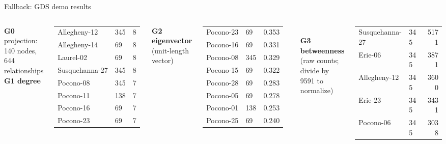 \documentclass[aspectratio=169, 10pt]{beamer}
\begin{document}
\begin{frame}[fragile]{Fallback: GDS demo results}
  \vspace{0.1cm}
  \scriptsize
  \begin{columns}[T]
      \textbf{G0} projection: 140 nodes, 644 relationships\\[6pt]
      \textbf{G1 degree}\\[2pt]
      \begin{tabular}{@{}llr@{}}\toprule
        Allegheny-12 & 345 & 8\\ Allegheny-14 & 69 & 8\\ Laurel-02 & 69 & 8\\ Susquehanna-27 & 345 & 8\\ Pocono-08 & 345 & 7\\ Pocono-11 & 138 & 7\\ Pocono-16 & 69 & 7\\ Pocono-23 & 69 & 7\\ \bottomrule
      \end{tabular}
      \textbf{G2 eigenvector} (unit-length vector)\\[2pt]
      \begin{tabular}{@{}llr@{}}\toprule
        Pocono-23 & 69 & 0.353\\ Pocono-16 & 69 & 0.331\\ Pocono-08 & 345 & 0.329\\ Pocono-15 & 69 & 0.322\\ Pocono-28 & 69 & 0.283\\ Pocono-05 & 69 & 0.278\\ Pocono-01 & 138 & 0.253\\ Pocono-25 & 69 & 0.240\\ \bottomrule
      \end{tabular}\\[6pt]
      \textbf{G3 betweenness} (raw counts; divide by 9591 to normalize)\\[2pt]
      \begin{tabular}{@{}llr@{}}\toprule
        Susquehanna-27 & 345 & 5171\\ Erie-06 & 345 & 3871\\ Allegheny-12 & 345 & 3600\\ Erie-23 & 345 & 3431\\ Pocono-06 & 345 & 3038\\ \bottomrule
      \end{tabular}

\end{columns}
\end{frame}
\end{document}
